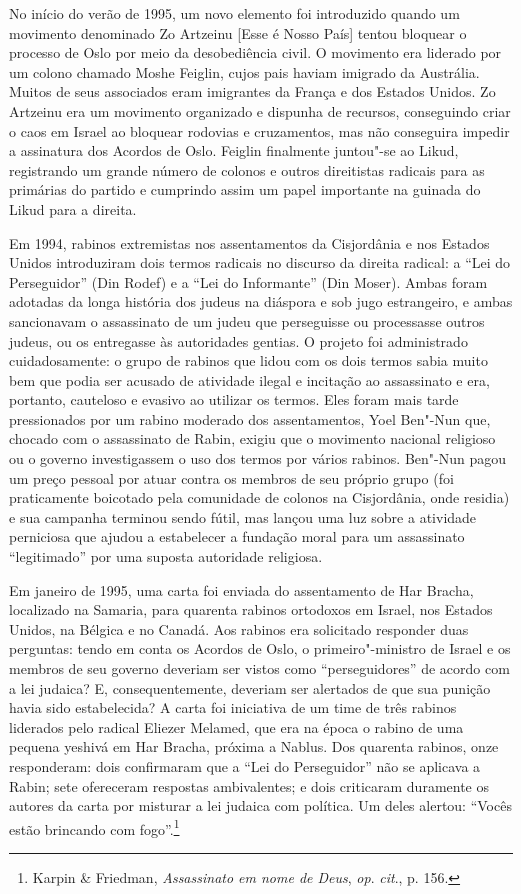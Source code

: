 No início do verão de 1995, um novo elemento foi introduzido quando um
movimento denominado Zo Artzeinu {[}Esse é Nosso País{]} tentou bloquear o
processo de Oslo por meio da desobediência civil. O movimento era
liderado por um colono chamado Moshe Feiglin, cujos pais haviam imigrado
da Austrália. Muitos de seus associados eram imigrantes da França e dos
Estados Unidos. Zo Artzeinu era um movimento organizado e dispunha de
recursos, conseguindo criar o caos em Israel ao bloquear rodovias e
cruzamentos, mas não conseguira impedir a assinatura dos Acordos
de Oslo. Feiglin finalmente juntou"-se ao Likud, registrando um grande
número de colonos e outros direitistas radicais para as primárias do
partido e cumprindo assim um papel importante na guinada do Likud para a
direita.

Em 1994, rabinos extremistas nos assentamentos da Cisjordânia e nos
Estados Unidos introduziram dois termos radicais no discurso da direita
radical: a ``Lei do Perseguidor'' (Din Rodef) e a ``Lei do Informante''
(Din Moser). Ambas foram adotadas da longa história dos judeus na
diáspora e sob jugo estrangeiro, e ambas sancionavam o assassinato de um
judeu que perseguisse ou processasse outros judeus, ou os entregasse às
autoridades gentias. O projeto foi administrado cuidadosamente: o grupo
de rabinos que lidou com os dois termos sabia muito bem que podia ser
acusado de atividade ilegal e incitação ao assassinato e era, portanto,
cauteloso e evasivo ao utilizar os termos. Eles foram mais tarde
pressionados por um rabino moderado dos assentamentos, Yoel Ben"-Nun que,
chocado com o assassinato de Rabin, exigiu que o movimento nacional
religioso ou o governo investigassem o uso dos termos por vários
rabinos. Ben"-Nun pagou um preço pessoal por atuar contra os membros de
seu próprio grupo (foi praticamente boicotado pela comunidade de colonos
na Cisjordânia, onde residia) e sua campanha terminou sendo fútil, mas
lançou uma luz sobre a atividade perniciosa que ajudou a estabelecer a
fundação moral para um assassinato ``legitimado'' por uma suposta
autoridade religiosa.

Em janeiro de 1995, uma carta foi enviada do assentamento de Har Bracha,
localizado na Samaria, para quarenta rabinos ortodoxos em Israel, nos
Estados Unidos, na Bélgica e no Canadá. Aos rabinos era solicitado
responder duas perguntas: tendo em conta os Acordos de Oslo, o primeiro"-ministro
de Israel e os membros de seu governo deveriam ser vistos como
``perseguidores'' de acordo com a lei judaica? E, consequentemente,
deveriam ser alertados de que sua punição havia sido estabelecida? A
carta foi iniciativa de um time de três rabinos liderados pelo radical
Eliezer Melamed, que era na época o rabino de uma pequena yeshivá em Har
Bracha, próxima a Nablus. Dos quarenta rabinos, onze responderam: dois
confirmaram que a ``Lei do Perseguidor'' não se aplicava a Rabin; sete
ofereceram respostas ambivalentes; e dois criticaram duramente os
autores da carta por misturar a lei judaica com política. Um deles
alertou: ``Vocês estão brincando com fogo''.\footnote{Karpin \& Friedman, 
\emph{Assassinato em nome de Deus}, \emph{op}. \emph{cit}., p. 156.}


